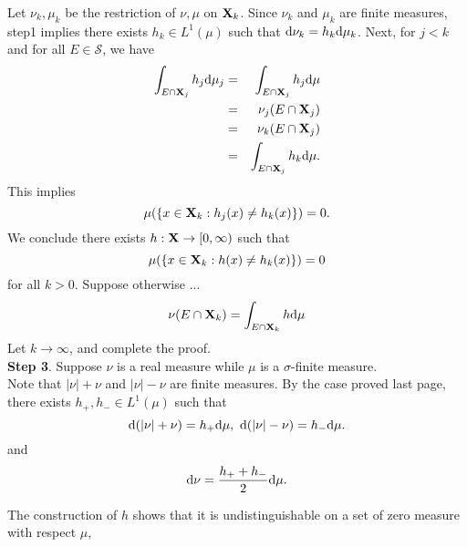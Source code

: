 \begin{Proof}
Let $\nu_k,\mu_k$ be the restriction of $\nu,\mu$ on $\mathbf{X}_k$. Since $\nu_k$ and $\mu_k$ are finite measures, step1 implies there exists $h_k \in L^1(\mu)$ such that $\mathrm{d} \nu_k = h_k \mathrm{d}\mu_k$. Next, for $j<k$ and for all $E \in \mathcal S$, we have
\begin{eqnarray*}
	\int_{E\cap\mathbf{X}_j}h_j \mathrm{d} \mu_j &=& \int_{E\cap \mathbf{X}_j}h_j \mathrm{d} \mu \\
	&=& \nu_j(E\cap \mathbf{X}_j) \\
	&=& \nu_k(E \cap \mathbf{X}_j) \\
	&=& \int_{E \cap \mathbf{X}_j}h_k \mathrm{d} \mu.
\end{eqnarray*}
This implies 
$$
\mu(\{x\in \mathbf{X}_k: h_j(x)\neq h_k(x)\})=0.
$$
We conclude there exists $h:\mathbf{X} \to [0,\infty)$ such that 
$$
\mu(\{x\in \mathbf{X}_k: h(x)\neq h_k(x)\})=0
$$
for all $k>0$. Suppose otherwise ...
$$
\nu(E\cap \mathbf{X}_k) = \int_{E\cap \mathbf{X}_k} h\mathrm{d} \mu
$$
Let $k \to \infty$, and complete the proof. \\
\textbf{Step 3}. Suppose $\nu$ is a real measure while $\mu$ is a $\sigma$-finite measure. \\
Note that $|\nu|+\nu$ and $|\nu|-\nu$ are finite measures. By the case proved last page, there exists $h_+, h_- \in L^1(\mu)$ such that 
$$
\mathrm{d} (|\nu|+\nu) = h_+ \mathrm{d} \mu,\ \mathrm{d} (|\nu|-\nu) = h_- \mathrm{d} \mu.
$$
and 
$$
\mathrm{d} \nu = \frac{h_+ + h_-}{2}\mathrm{d} \mu.
$$
\end{Proof}





































\begin{sremark}{}{}
The construction of $h$ shows that it is undistinguishable on a set of zero measure with respect $\mu$,
\end{sremark}

